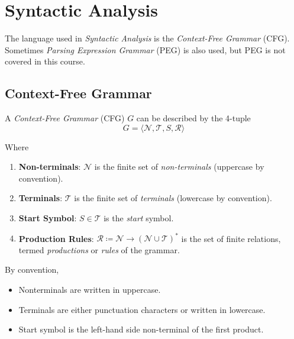 \section{Syntactic Analysis}

The language used in \textit{Syntactic Analysis} is the \textit{Context-Free Grammar} (CFG). Sometimes \textit{Parsing Expression Grammar} (PEG) is also used, but PEG is not covered in this course.

\subsection{Context-Free Grammar}

\begin{definition}
    A \textit{Context-Free Grammar} (CFG) $G$ can be described by the 4-tuple
    \begin{equation}
        G = \langle
            \mathcal{N},
            \mathcal{T},
            S,
            \mathcal{R}
        \rangle
    \end{equation}
    
    Where
    \begin{enumerate}
        \item \textbf{Non-terminals}: $\mathcal{N}$ is the finite set of \textit{non-terminals} (uppercase by convention).
        \item \textbf{Terminals}: $\mathcal{T}$ is the finite set of \textit{terminals} (lowercase by convention).
        \item \textbf{Start Symbol}: $S \in \mathcal{T}$ is the \textit{start} symbol.
        \item \textbf{Production Rules}: $\mathcal{R} \coloneqq \mathcal{N} \to (\mathcal{N} \cup \mathcal{T})^\ast$ is the set of finite relations, termed \textit{productions} or \textit{rules} of the grammar.
    \end{enumerate}
\end{definition}

\begin{remark}
    By convention,
    \begin{itemize}
        \item Nonterminals are written in uppercase.
        \item Terminals are either punctuation characters or written in lowercase.
        \item Start symbol is the left-hand side non-terminal of the first product.
    \end{itemize}
\end{remark}

